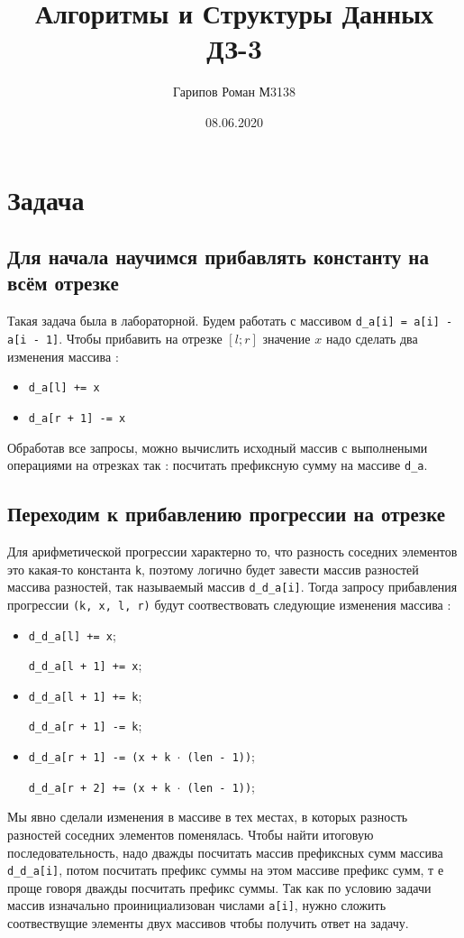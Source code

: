 \documentclass{article}
\title{Алгоритмы и Структуры Данных ДЗ-3}
\date{08.06.2020}
\author{Гарипов Роман М3138}
\begin{document}
  \maketitle
\section*{Задача }
\subsection*{Для начала научимся прибавлять константу на всём отрезке}
Такая задача была в лабораторной. Будем работать с массивом \texttt{d\_a[i] = a[i] - a[i - 1]}. Чтобы прибавить на отрезке $[l;r]$ значение $x$ надо сделать два изменения массива :
\begin{itemize}
\item \texttt{d\_a[l] += x}
\item \texttt{d\_a[r + 1] -= x}
\end{itemize}
Обработав все запросы, можно вычислить исходный массив с выполнеными операциями на отрезках так : посчитать префиксную сумму на массиве \texttt{d\_a}. 
\subsection*{Переходим к прибавлению прогрессии на отрезке}
Для арифметической прогрессии характерно то, что разность соседних элементов это какая-то константа \texttt{k}, поэтому логично будет завести массив разностей массива разностей, так называемый массив \texttt{d\_d\_a[i]}.
Тогда запросу прибавления прогрессии \texttt{(k, x, l, r)} будут соотвествовать следующие изменения массива :
\begin{itemize}
\item \texttt{d\_d\_a[l] += x};

 \texttt{d\_d\_a[l + 1] += x};
 
\item \texttt{d\_d\_a[l + 1] += k};

\texttt{d\_d\_a[r + 1] -= k};

\item  \texttt{d\_d\_a[r + 1] -= (x + k $\cdot$ (len - 1))};

\texttt{d\_d\_a[r + 2] += (x + k $\cdot$ (len - 1))};
\end{itemize}
Мы явно сделали изменения в массиве в тех местах, в которых разность разностей соседних элементов поменялась.
Чтобы найти итоговую последовательность, надо дважды посчитать массив префиксных сумм массива \texttt{d\_d\_a[i]}, потом посчитать префикс суммы на этом массиве префикс сумм, т е проще говоря дважды посчитать префикс суммы. Так как по условию задачи массив изначально проинициализован числами \texttt{a[i]}, нужно сложить соотвествущие элементы двух массивов чтобы получить ответ на задачу.
\end{document}
